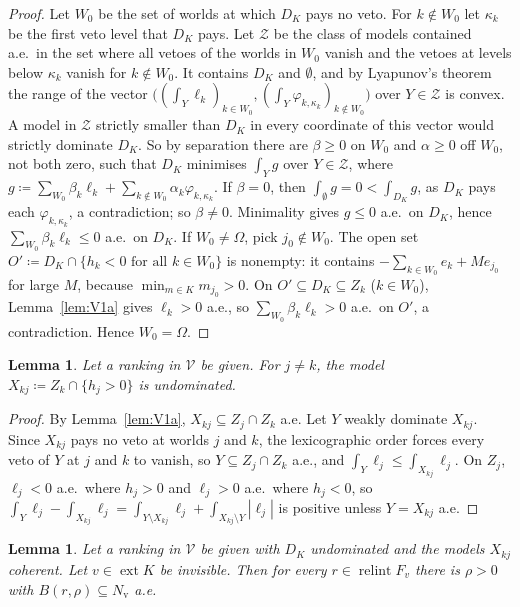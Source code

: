 \documentclass[11pt]{article}
\newcommand{\VV}{\mathcal{V}}
\DeclareMathOperator{\relint}{relint}
\DeclareMathOperator{\ext}{ext}
\theoremstyle{plain}
\newtheorem{lemma}[theorem]{Lemma}
\theoremstyle{definition}
\theoremstyle{remark}
\begin{document}
\begin{proof}
Let $W_0$ be the set of worlds at which $D_K$ pays no veto. For $k\notin W_0$ let
$\kappa_k$ be the first veto level that $D_K$ pays. Let $\mathcal Z$ be the class of
models contained a.e.\ in the set where all vetoes of the worlds in $W_0$ vanish and the
vetoes at levels below $\kappa_k$ vanish for $k\notin W_0$. It contains $D_K$ and
$\emptyset$, and by Lyapunov's theorem the range of the vector
$\bigl((\int_Y\ell_k)_{k\in W_0},(\int_Y\varphi_{k,\kappa_k})_{k\notin W_0}\bigr)$ over
$Y\in\mathcal Z$ is convex. A model in $\mathcal Z$ strictly smaller than $D_K$ in every
coordinate of this vector would strictly dominate $D_K$. So by separation there are
$\beta\ge0$ on $W_0$ and $\alpha\ge0$ off $W_0$, not both zero, such that $D_K$ minimises
$\int_Yg$ over $Y\in\mathcal Z$, where $g\coloneqq\sum_{W_0}\beta_k\ell_k+\sum_{k\notin W_0}
\alpha_k\varphi_{k,\kappa_k}$. If $\beta=0$, then $\int_\emptyset g=0<\int_{D_K}g$, as
$D_K$ pays each $\varphi_{k,\kappa_k}$, a contradiction; so $\beta\neq0$. Minimality gives
$g\le0$ a.e.\ on $D_K$, hence $\sum_{W_0}\beta_k\ell_k\le0$ a.e.\ on $D_K$. If
$W_0\ne\Omega$, pick $j_0\notin W_0$. The open set $O'\coloneqq D_K\cap\{h_k<0\text{ for
all }k\in W_0\}$ is nonempty: it contains $-\sum_{k\in W_0}e_k+Me_{j_0}$ for large $M$,
because $\min_{m\in K}m_{j_0}>0$. On $O'\subseteq D_K\subseteq Z_k$ ($k\in W_0$),
Lemma~\ref{lem:V1a} gives $\ell_k>0$ a.e., so $\sum_{W_0}\beta_k\ell_k>0$ a.e.\ on $O'$,
a contradiction. Hence $W_0=\Omega$.
\end{proof}

\begin{lemma}\label{lem:V3}
Let a ranking in $\VV$ be given. For $j\ne k$, the model $X_{kj}\coloneqq Z_k\cap
\{h_j>0\}$ is undominated.
\end{lemma}

\begin{proof}
By Lemma~\ref{lem:V1a}, $X_{kj}\subseteq Z_j\cap Z_k$ a.e. Let $Y$ weakly dominate
$X_{kj}$. Since $X_{kj}$ pays no veto at worlds $j$ and $k$, the lexicographic order forces
every veto of $Y$ at $j$ and $k$ to vanish, so $Y\subseteq Z_j\cap Z_k$ a.e., and
$\int_Y\ell_j\le\int_{X_{kj}}\ell_j$. On $Z_j$, $\ell_j<0$ a.e.\ where $h_j>0$ and
$\ell_j>0$ a.e.\ where $h_j<0$, so
$\int_Y\ell_j-\int_{X_{kj}}\ell_j=\int_{Y\setminus X_{kj}}\ell_j+\int_{X_{kj}\setminus Y}
|\ell_j|$ is positive unless $Y=X_{kj}$ a.e.
\end{proof}

\begin{lemma}\label{lem:V4}
Let a ranking in $\VV$ be given with $D_K$ undominated and the models $X_{kj}$
coherent. Let $v\in\ext K$ be invisible. Then for every $r\in\relint F_v$ there is
$\rho>0$ with $B(r,\rho)\subseteq N_{\mathrm v}$ a.e.
\end{lemma}
\end{document}
